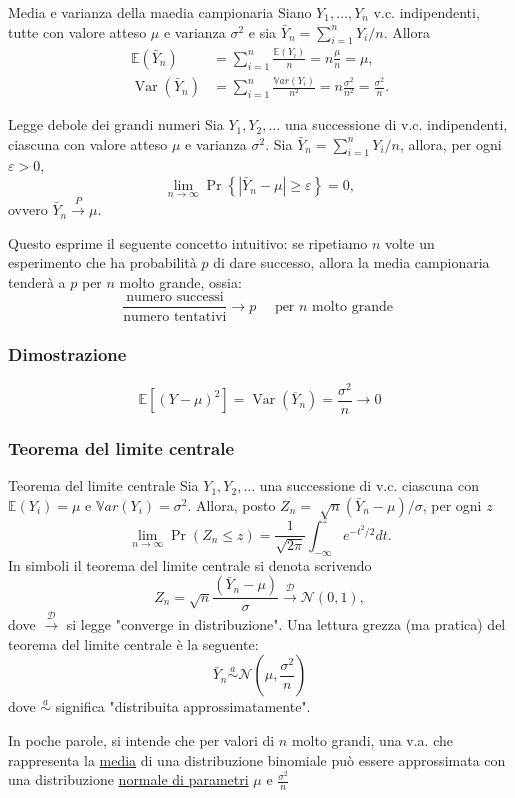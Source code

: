 \begin{teorema}{Media e varianza della maedia campionaria}
	Siano $Y_1, \ldots, Y_n$ v.c. indipendenti, tutte con valore atteso $\mu$ e varianza $\sigma^2$ e sia $\bar{Y}_n=\sum_{i=1}^n Y_i / n$. Allora
	\begin{align*}
		\mathbb{E}\left(\bar{Y}_n\right)         & =\sum_{i=1}^n \frac{\mathbb{E}\left(Y_i\right)}{n}=n \frac{\mu}{n}=\mu,                              \\
		\operatorname{Var}\left(\bar{Y}_n\right) & =\sum_{i=1}^n \frac{\mathbb{V} a r\left(Y_i\right)}{n^2}=n \frac{\sigma^2}{n^2}=\frac{\sigma^2}{n} .
	\end{align*}
\end{teorema}
\begin{teorema}{Legge debole dei grandi numeri }
	Sia $Y_1, Y_2, \ldots$ una successione di v.c. indipendenti, ciascuna con valore atteso $\mu$ e varianza $\sigma^2$. Sia $\bar{Y}_n=\sum_{i=1}^n Y_i / n$, allora, per ogni $\varepsilon>0$,
	\[
		\lim _{n \rightarrow \infty} \Pr\left\{\left|\bar{Y}_n-\mu\right| \geq \varepsilon\right\}=0,
	\]
	ovvero $\bar{Y}_n \stackrel{P}{\longrightarrow} \mu$.
\end{teorema}
Questo esprime il seguente concetto intuitivo: se ripetiamo $ n $ volte un esperimento che ha probabilità $ p $ di dare successo, allora la media campionaria tenderà a $ p $ per $ n $ molto grande, ossia:
\[
	\frac{\text{numero successi}}{\text{numero tentativi}} \to p \quad \text{ per } n \text{ molto grande }
\]
\subsubsection*{Dimostrazione}
\[
	\mathbb{E} \left[\left(Y - \mu \right)^2 \right] = \operatorname{Var}\left(\overline{Y}_n\right) = \frac{\sigma ^2 }{n}  \to  0
\]
\subsubsection*{Teorema del limite centrale}
\begin{teorema}{Teorema del limite centrale}
	Sia $Y_1, Y_2, \ldots$ una successione di v.c. ciascuna con $\mathbb{E}\left(Y_i\right)=\mu $ e $ \mathbb{V} a r\left(Y_i\right)=\sigma^2$. Allora, posto $Z_n=$ $\sqrt{n}\left(\bar{Y}_n-\mu\right) / \sigma$, per ogni $z$
	\[
		\lim _{n \rightarrow \infty} \operatorname{Pr}\left(Z_n \leq z\right)=\frac{1}{\sqrt{2 \pi}} \int_{-\infty}^z e^{-t^2 / 2} d t .
	\]
	In simboli il teorema del limite centrale si denota scrivendo
	\[
		Z_n=\sqrt{n} \frac{\left(\bar{Y}_n-\mu\right)}{\sigma} \stackrel{\mathcal{D}}{\longrightarrow} \mathcal{N}(0,1),
	\]
	dove $\stackrel{\mathcal{D}}{\longrightarrow}$ si legge "converge in distribuzione".
	Una lettura grezza (ma pratica) del teorema del limite centrale è la seguente:
	\[
		\bar{Y}_n \stackrel{a}{\sim} \mathcal{N}\left(\mu, \frac{\sigma^2}{n}\right)
	\]
	dove $\stackrel{a}{\sim}$ significa "distribuita approssimatamente".
\end{teorema}
In poche parole, si intende che per valori di $ n $ molto grandi, una v.a. che rappresenta la \underline{media} di una distribuzione binomiale può essere approssimata con una distribuzione \underline{normale di parametri} $ \mu  $ e $ \frac{\sigma ^2 }{n} $
